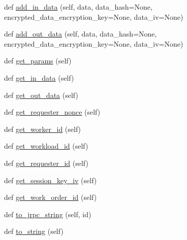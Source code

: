 \begin{DoxyCompactItemize}
def \hyperlink{classavalon__sdk_1_1work__order_1_1work__order__params_1_1WorkOrderParams_ad4246dcd636f2415be2ca90293e4bb0f}{add\+\_\+in\+\_\+data} (self, data, data\+\_\+hash=None, encrypted\+\_\+data\+\_\+encryption\+\_\+key=None, data\+\_\+iv=None)
\item 
def \hyperlink{classavalon__sdk_1_1work__order_1_1work__order__params_1_1WorkOrderParams_a39fd21edd400576672f20700935ff14d}{add\+\_\+out\+\_\+data} (self, data, data\+\_\+hash=None, encrypted\+\_\+data\+\_\+encryption\+\_\+key=None, data\+\_\+iv=None)
\item 
def \hyperlink{classavalon__sdk_1_1work__order_1_1work__order__params_1_1WorkOrderParams_a1bbb4448eef0eedfe342ff32c691f285}{get\+\_\+params} (self)
\item 
def \hyperlink{classavalon__sdk_1_1work__order_1_1work__order__params_1_1WorkOrderParams_a1d8660f7203b0522e09282cda7a34419}{get\+\_\+in\+\_\+data} (self)
\item 
def \hyperlink{classavalon__sdk_1_1work__order_1_1work__order__params_1_1WorkOrderParams_a44264ffc2a468940f8c77de341348255}{get\+\_\+out\+\_\+data} (self)
\item 
def \hyperlink{classavalon__sdk_1_1work__order_1_1work__order__params_1_1WorkOrderParams_a1098e4230db48d2edfecf85e303f6b7a}{get\+\_\+requester\+\_\+nonce} (self)
\item 
def \hyperlink{classavalon__sdk_1_1work__order_1_1work__order__params_1_1WorkOrderParams_ab22cc386cdc27f98eab4892d19120aaf}{get\+\_\+worker\+\_\+id} (self)
\item 
def \hyperlink{classavalon__sdk_1_1work__order_1_1work__order__params_1_1WorkOrderParams_a02866c7d5296ffd114983d6cb30a3c7b}{get\+\_\+workload\+\_\+id} (self)
\item 
def \hyperlink{classavalon__sdk_1_1work__order_1_1work__order__params_1_1WorkOrderParams_a868b4d295923fbe33a72e1d911a4529b}{get\+\_\+requester\+\_\+id} (self)
\item 
def \hyperlink{classavalon__sdk_1_1work__order_1_1work__order__params_1_1WorkOrderParams_a8dc8bc6b66e935c03c3454ff39fb574f}{get\+\_\+session\+\_\+key\+\_\+iv} (self)
\item 
def \hyperlink{classavalon__sdk_1_1work__order_1_1work__order__params_1_1WorkOrderParams_af955f652c19e8c3385211b1f343254bf}{get\+\_\+work\+\_\+order\+\_\+id} (self)
\item 
def \hyperlink{classavalon__sdk_1_1work__order_1_1work__order__params_1_1WorkOrderParams_aebe1deb48a14c18b8c645938ee9d777e}{to\+\_\+jrpc\+\_\+string} (self, id)
\item 
def \hyperlink{classavalon__sdk_1_1work__order_1_1work__order__params_1_1WorkOrderParams_a89ddf2c848b2cddd4231f579659e05e7}{to\+\_\+string} (self)
\end{DoxyCompactItemize}
